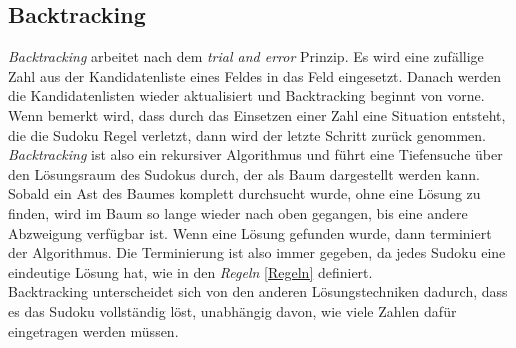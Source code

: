 \newpage
\subsection{Backtracking}
\label{Backtracking}
\textit{Backtracking} arbeitet nach dem \textit{trial and error} Prinzip. Es wird eine zufällige Zahl aus der Kandidatenliste eines Feldes in das Feld eingesetzt. Danach werden die Kandidatenlisten wieder aktualisiert und Backtracking beginnt von vorne. Wenn bemerkt wird, dass durch das Einsetzen einer Zahl eine Situation entsteht, die die Sudoku Regel verletzt, dann wird der letzte Schritt zurück genommen. \textit{Backtracking} ist also ein rekursiver Algorithmus und führt eine Tiefensuche über den Lösungsraum des Sudokus durch, der als Baum dargestellt werden kann. Sobald ein Ast des Baumes komplett durchsucht wurde, ohne eine Lösung zu finden, wird im Baum so lange wieder nach oben gegangen, bis eine andere Abzweigung verfügbar ist. Wenn eine Lösung gefunden wurde, dann terminiert der Algorithmus. Die Terminierung ist also immer gegeben, da jedes Sudoku eine eindeutige Lösung hat, wie in den \textit{Regeln} \ref{Regeln} definiert.\\
Backtracking unterscheidet sich von den anderen Lösungstechniken dadurch, dass es das Sudoku vollständig löst, unabhängig davon, wie viele Zahlen dafür eingetragen werden müssen.
